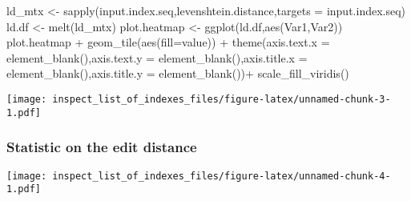 \documentclass[
]{article}
\newenvironment{Shaded}{\begin{snugshade}}{\end{snugshade}}
\newcommand{\AttributeTok}[1]{\textcolor[rgb]{0.77,0.63,0.00}{#1}}
\newcommand{\FunctionTok}[1]{\textcolor[rgb]{0.00,0.00,0.00}{#1}}
\newcommand{\NormalTok}[1]{#1}
\newcommand{\OtherTok}[1]{\textcolor[rgb]{0.56,0.35,0.01}{#1}}
\newcommand{\SpecialCharTok}[1]{\textcolor[rgb]{0.00,0.00,0.00}{#1}}
\begin{document}
\begin{Shaded}
\begin{Highlighting}[]
\NormalTok{ld\_mtx }\OtherTok{\textless{}{-}} \FunctionTok{sapply}\NormalTok{(input.index.seq,levenshtein.distance,}\AttributeTok{targets =}\NormalTok{ input.index.seq)}
\NormalTok{ld.df }\OtherTok{\textless{}{-}} \FunctionTok{melt}\NormalTok{(ld\_mtx)}
\NormalTok{plot.heatmap }\OtherTok{\textless{}{-}} \FunctionTok{ggplot}\NormalTok{(ld.df,}\FunctionTok{aes}\NormalTok{(Var1,Var2))}
\NormalTok{plot.heatmap }\SpecialCharTok{+} \FunctionTok{geom\_tile}\NormalTok{(}\FunctionTok{aes}\NormalTok{(}\AttributeTok{fill=}\NormalTok{value)) }\SpecialCharTok{+}
  \FunctionTok{theme}\NormalTok{(}\AttributeTok{axis.text.x =} \FunctionTok{element\_blank}\NormalTok{(),}\AttributeTok{axis.text.y =} \FunctionTok{element\_blank}\NormalTok{(),}\AttributeTok{axis.title.x =} \FunctionTok{element\_blank}\NormalTok{(),}\AttributeTok{axis.title.y =} \FunctionTok{element\_blank}\NormalTok{())}\SpecialCharTok{+}
  \FunctionTok{scale\_fill\_viridis}\NormalTok{()}
\end{Highlighting}
\end{Shaded}

\texttt{[image: inspect\_list\_of\_indexes\_files/figure-latex/unnamed-chunk-3-1.pdf]}

\hypertarget{statistic-on-the-edit-distance}{%
\subsubsection{Statistic on the edit
distance}\label{statistic-on-the-edit-distance}}

\begin{Shaded}
\end{Shaded}

\texttt{[image: inspect\_list\_of\_indexes\_files/figure-latex/unnamed-chunk-4-1.pdf]}
\end{document}
